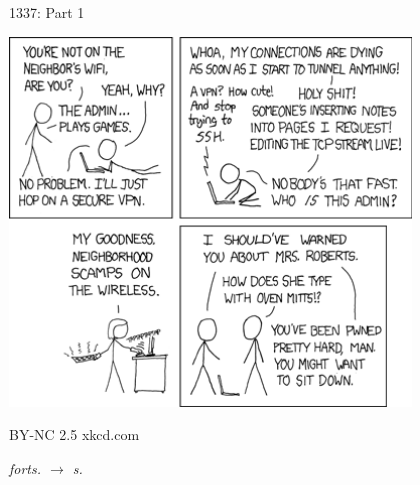 \documentclass[a6paper,fontsize=10pt,twoside,open=right]{scrbook}
\newcommand\textline[4][t]{%
  \vspace*{-5pt}\hfill\par\smallskip\noindent\parbox[#1]{.266\textwidth}{\raggedright\strut#2}%
  \parbox[#1]{.266\textwidth}{\centering\strut#3}%
  \parbox[#1]{.266\textwidth}{\raggedleft\strut#4}\hfill\par\smallskip%
}
\begin{document}

\newpage

\vspace{15pt}

\newpage

\vspace{15pt}

\vspace{15pt}

\newpage

\vspace{15pt}

\newpage

\vspace{15pt}

\newpage

\vspace{15pt}

\newpage

\vspace{15pt}

\newpage

\vspace{15pt}

\newpage

\vspace{15pt}

\newpage

\vspace{15pt}

\newpage

\vspace{15pt}

\newpage

\newpage
\null
\vfill
\vspace*{-10pt}
\begin{center}
  \label{13371}
  \tiny{1337: Part 1}\par
  \vspace{5pt}
  \includegraphics[keepaspectratio,width=0.8\textwidth]{elements/images/1337_part_1_1.png}\\
  \textline[t]{}{\tiny{BY-NC 2.5 xkcd.com}}{\tiny{\textit{forts. $\rightarrow$ s.\pageref{13372}}}}\par
\end{center}\par
\end{document}
